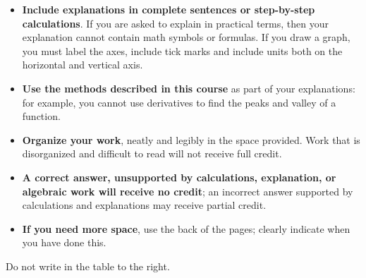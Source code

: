 \documentclass[11pt,answers]{exam}
\begin{document}
	\begin{minipage}[t]{3.7in}
		\vspace{0pt}
		\begin{itemize}
			
			\item \textbf{Include explanations in complete sentences or step-by-step calculations}. If you are asked to explain in practical terms, then your explanation cannot contain math symbols or formulas.  If you draw a graph, you must label the axes, include tick marks and include units both on the horizontal and vertical axis.
			\item \textbf{Use the methods described in this course} as part of your explanations: for example, you cannot use derivatives to find the peaks and valley of a function.
			
			\item \textbf{Organize your work}, neatly and legibly in
			the space provided. Work that is disorganized and difficult to read will not receive full credit.  
			
			
			
			\item \textbf{A correct answer, unsupported by calculations, explanation,
				or algebraic work will receive no credit}; an incorrect answer supported
			by  calculations and explanations may receive
			partial credit.
			
			
			\item \textbf{If you need more space}, use the back of the pages; clearly indicate when you have done this.
		\end{itemize}
		
		Do not write in the table to the right.
	\end{minipage}
	\hfill
	\begin{minipage}[t]{2.3in}
		\vspace{0pt}
		\addpoints %
		\combinedgradetable[v][pages]  %
		
	\end{minipage}
	\newpage
	
	
	
	\boxedpoints
	
\end{document}
